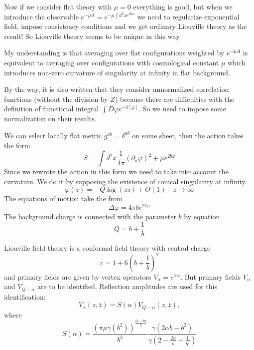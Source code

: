 \documentclass[12pt]{article}
\begin{document}
Now if we consider flat theory with $\mu=0$ everything is good, but when we introduce the observable
$e^{-\mu A}=e^{-\mu \int d^{2}x e^{2b\varphi}}$ we need to regularize exponential field, impose
consistency conditions and we get ordinary Liouville theory as the result! 
So Liouville theory seems to be unique in this way. 

My understanding is that averaging over flat configurations weighted by $e^{-\mu A}$ is equivalent
to averaging over configurations with cosmological constant $\mu$ which introduces non-zero
curvature of singularity at infinity in flat background. 

By the way, it is also written that they consider unnormalized correlation functions (without the
division by $Z$) because there are difficulties with the definition of functional integral $\int
D\varphi e^{-S[\varphi]}$. 
So we need to impose some normalization on their results. 

We can select locally flat metric $g^{ab}=\delta^{ab}$ on some sheet, then the action takes the form
\begin{equation}
  \label{eq:14}
  S= \int d^{2}x \frac{1}{4\pi} (\partial_{a} \varphi)^{2}+\mu e^{2b\varphi}
\end{equation}
Since we rewrote the action in this form we need to take into account the curvature. We do it by
supposing the existence of conical singularity at infinity.
\begin{equation}
  \label{eq:15}
  \varphi(z)=-Q \log (z\bar z)+O(1) \quad z\to\infty
\end{equation}
The equations of motion take the from
\begin{equation}
  \label{eq:18}
  \Delta \varphi = 4\pi b e^{2b\varphi}
\end{equation}
The background charge is connected with the parameter $b$ by equation
\begin{equation}
  \label{eq:20}
  Q=b+\frac{1}{b}
\end{equation}

Liouville field theory is a conformal field theory with central charge
\begin{equation}
  \label{eq:19}
  c=1+6\left(b+\frac{1}{b}\right)^{2}
\end{equation}
and primary fields are given by vertex operators $V_{\alpha}=e^{\alpha\varphi}$. But primary fields
$V_{\alpha}$ and $V_{Q-\alpha}$ are to be identified. 
Reflection amplitudes are used for this identification:
\begin{equation}
  \label{eq:87}
  V_{\alpha}(z,\bar z)=S(\alpha) V_{Q-\alpha}(z,\bar z),
\end{equation}
where
\begin{equation}
  \label{eq:88}
  S(\alpha)=\frac{\left(\pi\mu\gamma(b^{2})\right)^{\frac{Q-2\alpha}{b}}}{b^{2}}
  \frac{\gamma(2\alpha b -b^{2})}{\gamma\left(2-\frac{2\alpha}{b}+\frac{1}{b^{2}}\right)}
\end{equation}
\end{document}
